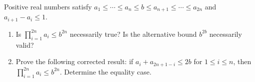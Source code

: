 Positive real numbers satisfy $a_1\le\cdots\le a_n\le b\le a_{n+1}\le\cdots\le a_{2n}$ and $a_{i+1}-a_i\le1$.
\begin{enumerate}
\item Is $\prod_{i=1}^{2n}a_i\le b^{2n}$ necessarily true? Is the alternative bound $b^{2b}$ necessarily valid?
\item Prove the following corrected result: if $a_i+a_{2n+1-i}\le2b$ for $1\le i\le n$, then $\prod_{i=1}^{2n}a_i\le b^{2n}$. Determine the equality case.
\end{enumerate}
